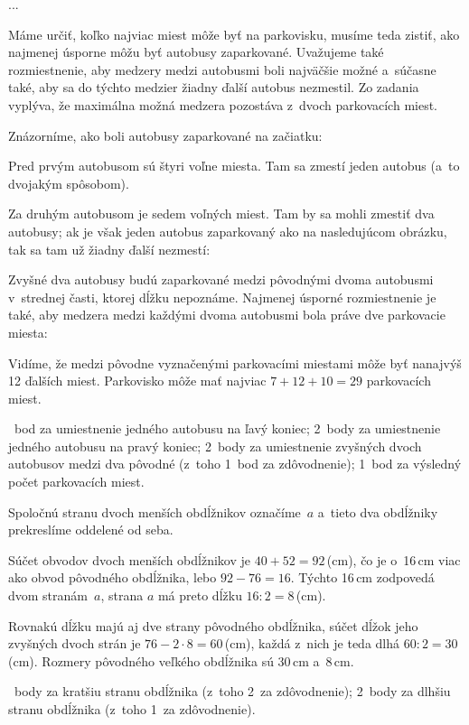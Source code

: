 {%
...}

{%
Máme určiť, koľko najviac miest môže byť na parkovisku, musíme teda
zistiť, ako najmenej úsporne môžu byť autobusy zaparkované.
Uvažujeme také rozmiestnenie, aby medzery medzi autobusmi boli najväčšie
možné a~súčasne také, aby sa do týchto medzier žiadny ďalší autobus
nezmestil. Zo zadania vyplýva, že maximálna možná medzera pozostáva z~dvoch
parkovacích miest.

Znázorníme, ako boli autobusy zaparkované na začiatku:
%

Pred prvým autobusom sú štyri voľne miesta.
Tam sa zmestí jeden autobus (a~to dvojakým spôsobom).

Za druhým autobusom je sedem voľných miest.
Tam by sa mohli zmestiť dva autobusy; ak je však jeden autobus zaparkovaný
ako na nasledujúcom obrázku, tak sa tam už žiadny ďalší nezmestí:
%

Zvyšné dva autobusy budú zaparkované medzi pôvodnými dvoma
autobusmi v~strednej časti, ktorej dĺžku nepoznáme.
Najmenej úsporné rozmiestnenie je také, aby medzera medzi každými dvoma
autobusmi bola práve dve parkovacie miesta:
%

Vidíme, že medzi pôvodne vyznačenými parkovacími miestami môže byť nanajvýš 12
ďalších miest.
Parkovisko môže mať najviac $7+12+10=29$ parkovacích miest.

~bod za umiestnenie jedného autobusu na ľavý koniec;
2~body za umiestnenie jedného autobusu na pravý koniec;
2~body za umiestnenie zvyšných dvoch autobusov medzi dva pôvodné (z~toho 1~bod za
zdôvodnenie);
1~bod za výsledný počet parkovacích miest.
\endhodnotenie
}

{%
Spoločnú stranu dvoch menších obdĺžnikov označíme~$a$
a~tieto dva obdĺžniky prekreslíme oddelené od seba.
%

Súčet obvodov dvoch menších obdĺžnikov je $40+52=92$\,(cm),
čo je o~16\,cm viac ako obvod pôvodného obdĺžnika, lebo $92-76=16$.
Týchto 16\,cm zodpovedá dvom stranám~$a$, strana $a$ má preto dĺžku
$16:2=8$\,(cm).

Rovnakú dĺžku majú aj dve strany pôvodného obdĺžnika, súčet
dĺžok jeho zvyšných dvoch strán je $76-2\cdot8=60$\,(cm), každá z~nich je teda
dlhá $60:2=30$\,(cm).
Rozmery pôvodného veľkého obdĺžnika sú 30\,cm a~8\,cm.

~body za kratšiu stranu obdĺžnika (z~toho 2~za zdôvodnenie);
2~body za dlhšiu stranu obdĺžnika (z~toho 1~za zdôvodnenie).
\endhodnotenie
}

